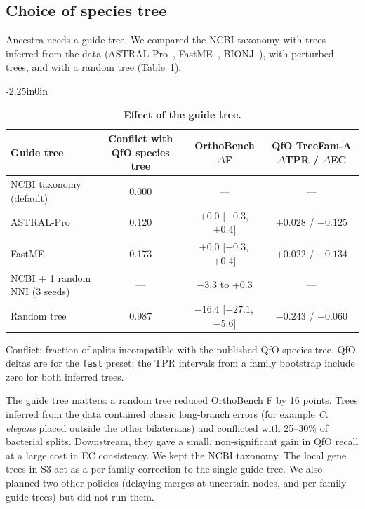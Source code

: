 \documentclass[10pt,letterpaper]{article}
\newcommand{\CI}[2]{[#1,\,#2]}
\begin{document}
\subsection*{Choice of species tree}
Ancestra needs a guide tree. We compared the NCBI taxonomy with trees inferred from the data (ASTRAL-Pro~\cite{zhang2020astralpro}, FastME~\cite{lefort2015fastme}, BIONJ~\cite{gascuel1997bionj}), with perturbed trees, and with a random tree (Table~\ref{tab:trees}).

\begin{table}[!ht]
\begin{adjustwidth}{-2.25in}{0in}
\centering
\caption{{\bf Effect of the guide tree.}}
\begin{tabular}{lccc}
\hline
Guide tree & Conflict with QfO species tree & OrthoBench $\Delta$F & QfO TreeFam-A $\Delta$TPR / $\Delta$EC\\
\hline
NCBI taxonomy (default) & 0.000 & --- & --- \\
ASTRAL-Pro & 0.120 & $+0.0$ \CI{$-0.3$}{$+0.4$} & $+0.028$ / $-0.125$\\
FastME & 0.173 & $+0.0$ \CI{$-0.3$}{$+0.4$} & $+0.022$ / $-0.134$\\
NCBI + 1 random NNI (3 seeds) & --- & $-3.3$ to $+0.3$ & ---\\
Random tree & 0.987 & $-16.4$ \CI{$-27.1$}{$-5.6$} & $-0.243$ / $-0.060$\\
\hline
\end{tabular}
\begin{flushleft}Conflict: fraction of splits incompatible with the published QfO species tree. QfO deltas are for the \texttt{fast} preset; the TPR intervals from a family bootstrap include zero for both inferred trees.
\end{flushleft}
\label{tab:trees}
\end{adjustwidth}
\end{table}

The guide tree matters: a random tree reduced OrthoBench F by 16 points. Trees inferred from the data contained classic long-branch errors (for example \textit{C. elegans} placed outside the other bilaterians) and conflicted with 25--30\% of bacterial splits. Downstream, they gave a small, non-significant gain in QfO recall at a large cost in EC consistency. We kept the NCBI taxonomy. The local gene trees in S3 act as a per-family correction to the single guide tree. We also planned two other policies (delaying merges at uncertain nodes, and per-family guide trees) but did not run them.
\end{document}

